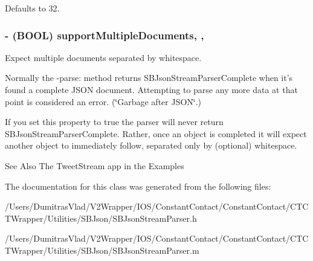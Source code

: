 Defaults to 32. \hypertarget{interface_s_b_json_stream_parser_afd976c605b67edbb8b7abbebcc5b4093}{
\subsubsection[{support\-Multiple\-Documents}]{\setlength{\rightskip}{0pt plus 5cm}-\/ (B\-O\-O\-L) support\-Multiple\-Documents\hspace{0.3cm}{\ttfamily [read]}, {\ttfamily [write]}, {\ttfamily [atomic]}}}\label{interface_s_b_json_stream_parser_afd976c605b67edbb8b7abbebcc5b4093}


Expect multiple documents separated by whitespace. 

Normally the {\ttfamily -\/parse}\-: method returns S\-B\-Json\-Stream\-Parser\-Complete when it's found a complete J\-S\-O\-N document. Attempting to parse any more data at that point is considered an error. (\char`\"{}\-Garbage after J\-S\-O\-N\char`\"{}.)

If you set this property to true the parser will never return S\-B\-Json\-Stream\-Parser\-Complete. Rather, once an object is completed it will expect another object to immediately follow, separated only by (optional) whitespace.

\begin{DoxySeeAlso}{See Also}
The Tweet\-Stream app in the Examples 
\end{DoxySeeAlso}


The documentation for this class was generated from the following files\-:\begin{DoxyCompactItemize}
\item 
/\-Users/\-Dumitras\-Vlad/\-V2\-Wrapper/\-I\-O\-S/\-Constant\-Contact/\-Constant\-Contact/\-C\-T\-C\-T\-Wrapper/\-Utilities/\-S\-B\-Json/S\-B\-Json\-Stream\-Parser.\-h\item 
/\-Users/\-Dumitras\-Vlad/\-V2\-Wrapper/\-I\-O\-S/\-Constant\-Contact/\-Constant\-Contact/\-C\-T\-C\-T\-Wrapper/\-Utilities/\-S\-B\-Json/S\-B\-Json\-Stream\-Parser.\-m\end{DoxyCompactItemize}
